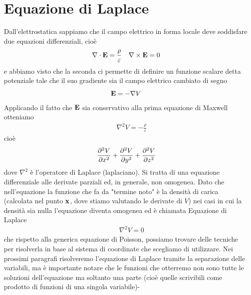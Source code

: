 \chapter{Equazione di Laplace}
Dall'elettrostatica sappiamo che il campo elettrico in forma locale deve soddisfare
due equazioni differenziali, cioè
\begin{align}
  \nabla\cdot\v{ E } = \frac{\rho}{\varepsilon} \quad \v{\nabla}\times\v{ E } = 0
\end{align}
e abbiamo visto che la seconda ci permette di definire un funzione scalare detta potenziale tale che il suo 
gradiente sia il campo elettrico cambiato di segno
\begin{equation}
  \v{ E } = -\nabla V
\end{equation}
Applicando il fatto che $ \v{ E } $ sia conservativo alla prima equazione di Maxwell otteniamo
\begin{align} \label{eq:Poisson}
  && \nabla^2 V = -\frac{\rho}{\varepsilon} \tag*{[Equazione di Poisson]}
\end{align}
cioè
\begin{equation}
  \der[2]{V}{x} + \der[2]{V}{y} + \der[2]{V}{z}
\end{equation}
dove $ \nabla^2 $ è l'operatore di Laplace (laplaciano). Si tratta di una equazione differenziale alle 
derivate parziali ed, in generale, non omogenea. Dato che nell'equazione la funzione che fa da "termine noto" è la 
densità di carica (calcolata nel punto $ \v{ x } $, dove stiamo valutando le derivate di $ V $) nei casi in 
cui la densità sia nulla l'equazione diventa omogenea ed è chiamata Equazione di Laplace
\begin{align} \label{eq:Laplace}
  && \nabla^2 V = 0 \tag*{[Equazione di Laplace]}
\end{align}
che rispetto alla generica equazione di Poisson, possiamo trovare delle tecniche per risolverla in base al sistema di 
coordinate che scegliamo di utilizzare. Nei prossimi paragrafi risolveremo l'equazione di Laplace tramite la 
separazione delle variabili, ma è importante notare che le funzioni che otterremo non sono tutte le soluzioni 
dell'equazione ma soltanto una parte (cioè quelle scrivibili come prodotto di funzioni di una singola variabile)-

